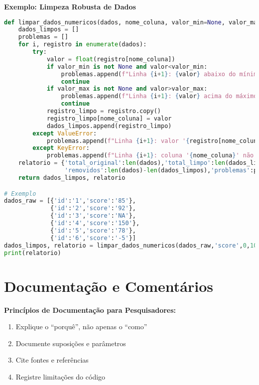 \begin{examplebox}
\textbf{Exemplo: Limpeza Robusta de Dados}

\begin{lstlisting}[language=Python,breaklines=true,postbreak=\mbox{\textcolor{red}{$\hookrightarrow$}\space}]
def limpar_dados_numericos(dados, nome_coluna, valor_min=None, valor_max=None):
    dados_limpos = []
    problemas = []
    for i, registro in enumerate(dados):
        try:
            valor = float(registro[nome_coluna])
            if valor_min is not None and valor<valor_min:
                problemas.append(f"Linha {i+1}: {valor} abaixo do mínimo {valor_min}")
                continue
            if valor_max is not None and valor>valor_max:
                problemas.append(f"Linha {i+1}: {valor} acima do máximo {valor_max}")
                continue
            registro_limpo = registro.copy()
            registro_limpo[nome_coluna] = valor
            dados_limpos.append(registro_limpo)
        except ValueError:
            problemas.append(f"Linha {i+1}: valor '{registro[nome_coluna]}' não é numérico")
        except KeyError:
            problemas.append(f"Linha {i+1}: coluna '{nome_coluna}' não encontrada")
    relatorio = {'total_original':len(dados),'total_limpo':len(dados_limpos),
                 'removidos':len(dados)-len(dados_limpos),'problemas':problemas}
    return dados_limpos, relatorio

# Exemplo
dados_raw = [{'id':'1','score':'85'},
             {'id':'2','score':'92'},
             {'id':'3','score':'NA'},
             {'id':'4','score':'150'},
             {'id':'5','score':'78'},
             {'id':'6','score':'-5'}]
dados_limpos, relatorio = limpar_dados_numericos(dados_raw,'score',0,100)
print(relatorio)
\end{lstlisting}
\end{examplebox}

\section{Documentação e Comentários}

\begin{warningbox}
\textbf{Princípios de Documentação para Pesquisadores:}
\begin{enumerate}
    \item Explique o “porquê”, não apenas o “como”
    \item Documente suposições e parâmetros
    \item Cite fontes e referências
    \item Registre limitações do código
\end{enumerate}
\end{warningbox}

